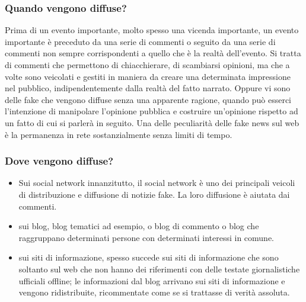 \subsubsection{Quando vengono diffuse?}
Prima di un evento importante, molto spesso una vicenda importante, un evento importante è preceduto da una serie di commenti o seguito da una serie di commenti non sempre corrispondenti a quello che è la realtà dell'evento. Si tratta di commenti che permettono di chiacchierare, di scambiarsi opinioni, ma che a volte sono veicolati e gestiti in maniera da creare una determinata impressione nel pubblico, indipendentemente dalla realtà del fatto narrato.
Oppure vi sono delle fake che vengono diffuse senza una apparente ragione, quando può esserci l'intenzione di manipolare l'opinione pubblica e costruire un'opinione rispetto ad un fatto di cui si parlerà in seguito. 
Una delle peculiarità delle fake news sul web è la permanenza in rete sostanzialmente senza limiti di tempo. 

\subsubsection{Dove vengono diffuse?}
\begin{itemize}
    \item Sui social network innanzitutto, il social network è uno dei principali veicoli di distribuzione e diffusione di notizie fake. La loro diffusione è aiutata dai commenti.
    \item sui blog, blog tematici ad esempio, o blog di commento o blog che raggruppano determinati persone con determinati interessi in comune. 
    \item sui siti di informazione, spesso succede sui siti di informazione che sono soltanto sul web che non hanno dei riferimenti con delle testate giornalistiche ufficiali offline; le informazioni dal blog arrivano sui siti di informazione e vengono ridistribuite, ricommentate come se si trattasse di verità assoluta.
\end{itemize}

